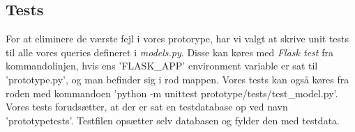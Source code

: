 \subsection{Tests}
For at eliminere de værste fejl i vores protorype, har vi valgt at skrive unit tests til alle vores queries defineret i \textit{models.py}. Disse kan køres med \textit{Flask test} fra kommandolinjen, hvis ens 'FLASK\_APP' environment variable er sat til 'prototype.py', og man befinder sig i rod mappen. Vores tests kan også køres fra roden med kommandoen 'python -m unittest prototype/tests/test\_model.py'.\\
Vores tests forudsætter, at der er sat en testdatabase op ved navn 'prototypetests'. Testfilen opsætter selv databasen og fylder den med testdata.

